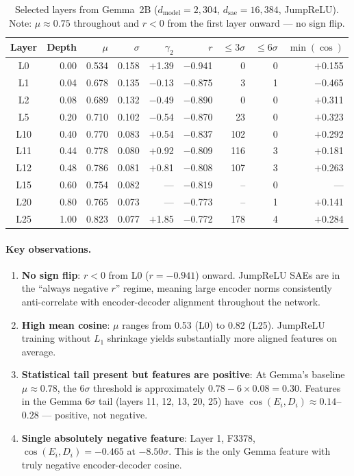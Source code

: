 \documentclass[11pt,a4paper]{article}
\newcommand{\cosED}{\cos(E_i, D_i)}
\begin{document}
\begin{table}[H]
\centering
\caption{Selected layers from Gemma~2B ($d_\text{model}=2{,}304$, $d_\text{sae}=16{,}384$, JumpReLU). Note: $\mu \approx 0.75$ throughout and $r < 0$ from the first layer onward --- no sign flip.}
\label{tab:gemma}
\small
\setlength{\tabcolsep}{4.5pt}
\begin{tabular}{@{}crrrrrrrr@{}}
\toprule
Layer & Depth & $\mu$ & $\sigma$ & $\gamma_2$ & $r$ & ${\leq}3\sigma$ & ${\leq}6\sigma$ & $\min(\cos)$ \\
\midrule
L0  & 0.00 & 0.534 & 0.158 & $+$1.39 & $-$0.941 &   0 & 0 & $+$0.155 \\
L1  & 0.04 & 0.678 & 0.135 & $-$0.13 & $-$0.875 &   3 & 1 & $-$0.465 \\
L2  & 0.08 & 0.689 & 0.132 & $-$0.49 & $-$0.890 &   0 & 0 & $+$0.311 \\
L5  & 0.20 & 0.710 & 0.102 & $-$0.54 & $-$0.870 &  23 & 0 & $+$0.323 \\
L10 & 0.40 & 0.770 & 0.083 & $+$0.54 & $-$0.837 & 102 & 0 & $+$0.292 \\
L11 & 0.44 & 0.778 & 0.080 & $+$0.92 & $-$0.809 & 116 & 3 & $+$0.181 \\
L12 & 0.48 & 0.786 & 0.081 & $+$0.81 & $-$0.808 & 107 & 3 & $+$0.263 \\
L15 & 0.60 & 0.754 & 0.082 & ---     & $-$0.819 &  -- & 0 & --- \\
L20 & 0.80 & 0.765 & 0.073 & ---     & $-$0.773 &  -- & 1 & $+$0.141 \\
L25 & 1.00 & 0.823 & 0.077 & $+$1.85 & $-$0.772 & 178 & 4 & $+$0.284 \\
\bottomrule
\end{tabular}
\end{table}

\paragraph{Key observations.}
\begin{enumerate}
  \item \textbf{No sign flip}: $r < 0$ from L0 ($r = -0.941$) onward. JumpReLU SAEs are in the ``always negative $r$'' regime, meaning large encoder norms consistently anti-correlate with encoder-decoder alignment throughout the network.
  \item \textbf{High mean cosine}: $\mu$ ranges from 0.53 (L0) to 0.82 (L25). JumpReLU training without $L_1$ shrinkage yields substantially more aligned features on average.
  \item \textbf{Statistical tail present but features are positive}: At Gemma's baseline $\mu \approx 0.78$, the $6\sigma$ threshold is approximately $0.78 - 6 \times 0.08 = 0.30$. Features in the Gemma $6\sigma$ tail (layers 11, 12, 13, 20, 25) have $\cosED \approx 0.14$--$0.28$ --- positive, not negative.
  \item \textbf{Single absolutely negative feature}: Layer 1, F3378, $\cosED = -0.465$ at $-8.50\sigma$. This is the only Gemma feature with truly negative encoder-decoder cosine.
\end{enumerate}
\end{document}
